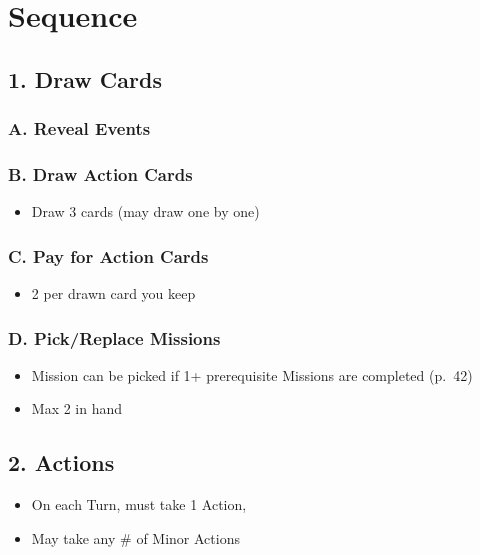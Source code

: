 \documentclass[10pt]{article}
\begin{document}
\addfooter

\section*{Sequence }
\subsection*{1. Draw Cards}
\subsubsection*{A. Reveal Events}
\subsubsection*{B. Draw Action Cards}

\begin{itemize}
	\item Draw 3 cards (may draw one by one)
\end{itemize}

\subsubsection*{C. Pay for Action Cards}
\begin{itemize}
	\item 2 \ducats per drawn card you keep
\end{itemize}

\subsubsection*{D. Pick/Replace Missions}
\begin{itemize}
	\item Mission can be picked if 1+ prerequisite Missions are completed (p.~42)
	\item Max 2 in hand
\end{itemize}

\subsection*{2. Actions}
\begin{itemize}
	\item On each Turn, must take 1 Action, 
	\item May take any \# of Minor Actions
\end{itemize}
\end{document}

